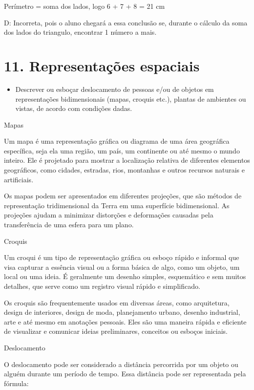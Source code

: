 Perímetro = soma dos lados, logo 6 + 7 + 8 = 21 cm

D: Incorreta, pois o aluno chegará a essa conclusão se, durante o
cálculo da soma dos lados do triangulo, encontrar 1 número a mais.

\hypertarget{representauxe7uxf5es-espaciais}{%
\section{11. Representações
espaciais}\label{representauxe7uxf5es-espaciais}}

\begin{itemize}
\tightlist
\item
  Descrever ou esboçar deslocamento de pessoas e/ou de objetos em
  representações bidimensionais (mapas, croquis etc.), plantas de
  ambientes ou vistas, de acordo com condições dadas.
\end{itemize}

Mapas

Um mapa é uma representação gráfica ou diagrama de uma área geográfica
específica, seja ela uma região, um país, um continente ou até mesmo o
mundo inteiro. Ele é projetado para mostrar a localização relativa de
diferentes elementos geográficos, como cidades, estradas, rios,
montanhas e outros recursos naturais e artificiais.

Os mapas podem ser apresentados em diferentes projeções, que são métodos
de representação tridimensional da Terra em uma superfície
bidimensional. As projeções ajudam a minimizar distorções e deformações
causadas pela transferência de uma esfera para um plano.

Croquis

Um croqui é um tipo de representação gráfica ou esboço rápido e informal
que visa capturar a essência visual ou a forma básica de algo, como um
objeto, um local ou uma ideia. É geralmente um desenho simples,
esquemático e sem muitos detalhes, que serve como um registro visual
rápido e simplificado.

Os croquis são frequentemente usados em diversas áreas, como
arquitetura, design de interiores, design de moda, planejamento urbano,
desenho industrial, arte e até mesmo em anotações pessoais. Eles são uma
maneira rápida e eficiente de visualizar e comunicar ideias
preliminares, conceitos ou esboços iniciais.

Deslocamento

O deslocamento pode ser considerado a distância percorrida por um objeto
ou alguém durante um período de tempo. Essa distância pode ser
representada pela fórmula:

